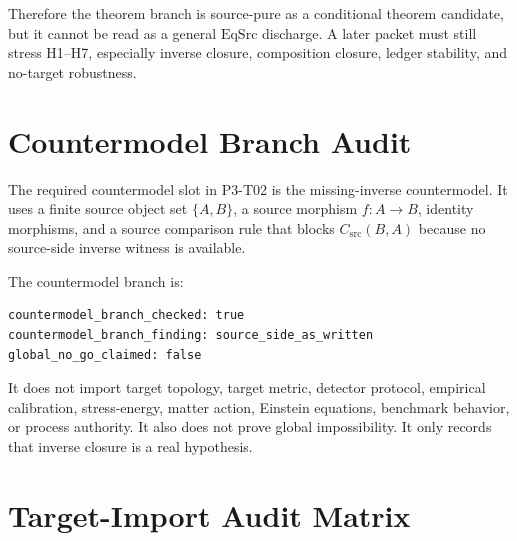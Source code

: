 \documentclass[11pt]{article}
\newcommand{\EqSrc}{\mathrm{EqSrc}}
\newcommand{\Csrc}{C_{\mathrm{src}}}
\begin{document}
Therefore the theorem branch is source-pure as a conditional theorem
candidate, but it cannot be read as a general \(\EqSrc\) discharge. A later
packet must still stress H1--H7, especially inverse closure, composition
closure, ledger stability, and no-target robustness.

\section{Countermodel Branch Audit}

The required countermodel slot in P3-T02 is the missing-inverse countermodel.
It uses a finite source object set \(\{A,B\}\), a source morphism
\(f:A\to B\), identity morphisms, and a source comparison rule that blocks
\(\Csrc(B,A)\) because no source-side inverse witness is available.

The countermodel branch is:

\begin{verbatim}
countermodel_branch_checked: true
countermodel_branch_finding: source_side_as_written
global_no_go_claimed: false
\end{verbatim}

It does not import target topology, target metric, detector protocol,
empirical calibration, stress-energy, matter action, Einstein equations,
benchmark behavior, or process authority. It also does not prove global
impossibility. It only records that inverse closure is a real hypothesis.

\section{Target-Import Audit Matrix}
\end{document}
